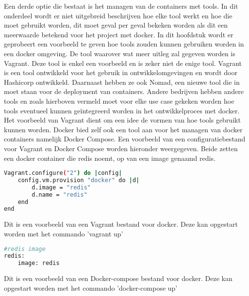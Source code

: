 Een derde optie die bestaat is het managen van de containers met tools. In dit onderdeel wordt er niet uitgebreid beschrijven hoe elke tool werkt en hoe die moet gebruikt worden, dit moet geval per geval bekeken worden als dit een meerwaarde betekend voor het project met docker. In dit hoofdstuk wordt er geprobeert een voorbeeld te geven hoe tools zouden kunnen gebruiken worden in een docker omgeving. De tool waarover wat meer uitleg zal gegeven worden is Vagrant. Deze tool is enkel een voorbeeld en is zeker niet de enige tool. Vagrant is een tool ontwikkeld voor het gebruik in ontwikkelomgevingen en wordt door Hashicorp ontwikkeld. Daarnaast hebben ze ook Nomad, een nieuwe tool die in moet staan voor de deployment van containers. Andere bedrijven hebben andere tools en zoals hierboven vermeld moet voor elke use case gekeken worden hoe tools eventueel kunnen geïntegreerd worden in het ontwikkelproces met docker. Het voorbeeld van Vagrant dient om een idee de vormen van hoe tools gebruikt kunnen worden. Docker bied zelf ook een tool aan voor het managen van docker containers namelijk Docker Compose. Een voorbeeld van een configuratiebestand voor Vagrant en Docker Compose worden hieronder weergegeven. Beide zetten een docker container die redis noemt, op van een image genaamd redis.

\begin{lstlisting}[language=bash, style=configstyle]
Vagrant.configure("2") do |config|
	config.vm.provision "docker" do |d|
		d.image = "redis"
		d.name = "redis"
	end
end
\end{lstlisting}
Dit is een voorbeeld van een Vagrant bestand voor docker. Deze kan opgestart worden met het commando 'vagrant up'


\begin{lstlisting}[language=bash, style=configstyle]
#redis image
redis:
	image: redis
\end{lstlisting}
Dit is een voorbeeld van een Docker-compose bestand voor docker. Deze kan opgestart worden met het commando 'docker-compose up'


